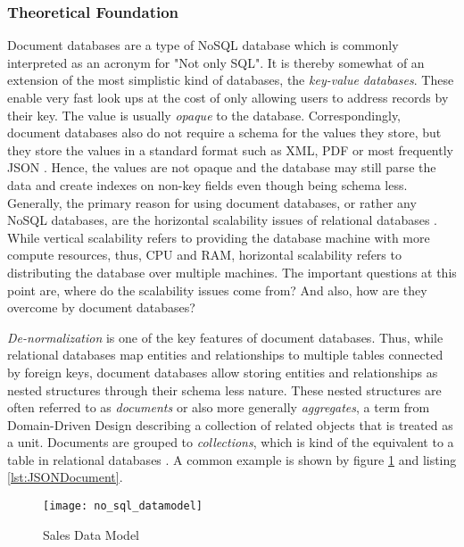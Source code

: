 \subsubsection{Theoretical Foundation}
Document databases are a type of NoSQL database which is commonly interpreted as an acronym for "Not only SQL". It is thereby somewhat of an extension of the most simplistic kind of databases, the \emph{key-value databases}. These enable very fast look ups at the cost of only allowing users to address records by their key. The value is usually \emph{opaque} to the database. Correspondingly, document databases also do not require a schema for the values they store, but they store the values in a standard format such as XML, PDF or most frequently JSON \cite{NoSQL}. Hence, the values are not opaque and the database may still parse the data and create indexes on non-key fields even though being schema less.\\

Generally, the primary reason for using document databases, or rather any NoSQL databases, are the horizontal scalability issues of relational databases \cite{NoSQL}. While vertical scalability refers to providing the database machine with more compute resources, thus, CPU and RAM, horizontal scalability refers to distributing the database over multiple machines. The important questions at this point are, where do the scalability issues come from? And also, how are they overcome by document databases?\par
\emph{De-normalization} is one of the key features of document databases. Thus, while relational databases map entities and relationships to multiple tables connected by foreign keys, document databases allow storing entities and relationships as nested structures through their schema less nature. These nested structures are often referred to as \emph{documents} or also more generally \emph{aggregates}, a term from Domain-Driven Design describing a collection of related objects that is treated as a unit. Documents are grouped to \emph{collections}, which is kind of the equivalent to a table in relational databases \cite{NoSQLDistilled}. A common example is shown by figure \ref{fig:NoSQLDataModel} and listing \ref{lst:JSONDocument}.\par 

\begin{figure}[H]
	\centering
	\texttt{[image: no\_sql\_datamodel]}
	\caption[Sales Data Model]{Sales Data Model }
	\label{fig:NoSQLDataModel}
\end{figure}


